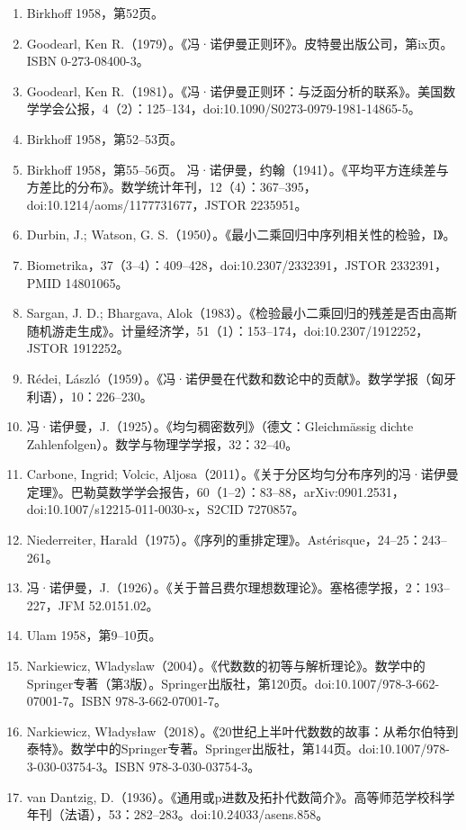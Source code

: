 \begin{enumerate}
\item Birkhoff 1958，第52页。  
\item Goodearl, Ken R.（1979）。《冯·诺伊曼正则环》。皮特曼出版公司，第ix页。ISBN 0-273-08400-3。  
\item Goodearl, Ken R.（1981）。《冯·诺伊曼正则环：与泛函分析的联系》。美国数学学会公报，4（2）：125–134，doi:10.1090/S0273-0979-1981-14865-5。  
\item Birkhoff 1958，第52–53页。  
\item Birkhoff 1958，第55–56页。  
冯·诺伊曼，约翰（1941）。《平均平方连续差与方差比的分布》。数学统计年刊，12（4）：367–395，doi:10.1214/aoms/1177731677，JSTOR 2235951。  
\item Durbin, J.; Watson, G. S.（1950）。《最小二乘回归中序列相关性的检验，I》。\item Biometrika，37（3–4）：409–428，doi:10.2307/2332391，JSTOR 2332391，PMID 14801065。  
\item Sargan, J. D.; Bhargava, Alok（1983）。《检验最小二乘回归的残差是否由高斯随机游走生成》。计量经济学，51（1）：153–174，doi:10.2307/1912252，JSTOR 1912252。  
\item Rédei, László（1959）。《冯·诺伊曼在代数和数论中的贡献》。数学学报（匈牙利语），10：226–230。  
\item 冯·诺伊曼，J.（1925）。《均匀稠密数列》（德文：Gleichmässig dichte Zahlenfolgen）。数学与物理学学报，32：32–40。  
\item Carbone, Ingrid; Volcic, Aljosa（2011）。《关于分区均匀分布序列的冯·诺伊曼定理》。巴勒莫数学学会报告，60（1–2）：83–88，arXiv:0901.2531，doi:10.1007/s12215-011-0030-x，S2CID 7270857。  
\item Niederreiter, Harald（1975）。《序列的重排定理》。Astérisque，24–25：243–261。  
\item 冯·诺伊曼，J.（1926）。《关于普吕费尔理想数理论》。塞格德学报，2：193–227，JFM 52.0151.02。  
\item Ulam 1958，第9–10页。  
\item Narkiewicz, Wladyslaw（2004）。《代数数的初等与解析理论》。数学中的Springer专著（第3版）。Springer出版社，第120页。doi:10.1007/978-3-662-07001-7。ISBN 978-3-662-07001-7。  
\item Narkiewicz, Władysław（2018）。《20世纪上半叶代数数的故事：从希尔伯特到泰特》。数学中的Springer专著。Springer出版社，第144页。doi:10.1007/978-3-030-03754-3。ISBN 978-3-030-03754-3。  
\item van Dantzig, D.（1936）。《通用或p进数及拓扑代数简介》。高等师范学校科学年刊（法语），53：282–283。doi:10.24033/asens.858。  

\end{enumerate}

